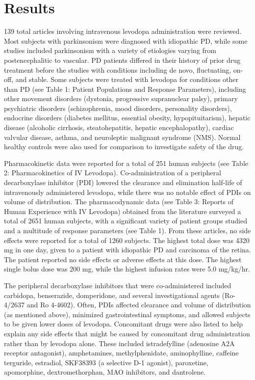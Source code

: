 \section{Results}
139 total articles involving intravenous levodopa administration were reviewed.  Most subjects with parkinsonism were diagnosed with idiopathic PD, while some studies included parkinsonism with a variety of etiologies varying from postencephalitic to vascular.  PD patients differed in their history of prior drug treatment before the studies with conditions including de novo, fluctuating, on-off, and stable.  Some subjects were treated with levodopa for conditions other than PD (see Table 1: Patient Populations and Response Parameters), including other movement disorders (dystonia, progressive supranuclear palsy), primary psychiatric disorders (schizophrenia, mood disorders, personality disorders),  endocrine disorders (diabetes mellitus, essential obesity, hypopituitarism), hepatic disease (alcoholic cirrhosis, steatohepatitis, hepatic encephalopathy), cardiac valvular disease, asthma, and neuroleptic malignant syndrome (NMS).  Normal healthy controls were also used for comparison to investigate safety of the drug.

Pharmacokinetic data were reported for a total of 251 human subjects (see Table 2: Pharmacokinetics of IV Levodopa).  Co-administration of a peripheral decarboxylase inhibitor (PDI) lowered the clearance and elimination half-life of intravenously administered levodopa, while there was no notable effect of PDIs on volume of distribution.
The pharmacodynamic data (see Table 3: Reports of Human Experience with IV Levodopa) obtained from the literature  surveyed a total of 2651 human subjects, with a significant variety of patient groups studied and a multitude of response parameters (see Table 1).  From these articles, no side effects were reported for a total of 1260 subjects.  The highest total dose was 4320 mg in one day, given to a patient with idiopathic PD and carcinoma of the retina.  The patient reported no side effects or adverse effects at this dose.  The highest single bolus dose was 200 mg, while the highest infusion rates were 5.0 mg/kg/hr.

The peripheral decarboxylase inhibitors that were co-administered included carbidopa, benserazide, domperidone, and several investigational agents (Ro-4/2637 and Ro 4-4602).  Often, PDIs affected clearance and volume of distribution (as mentioned above), minimized gastrointestinal symptoms, and allowed subjects to be given lower doses of levodopa.    
Concomitant drugs were also listed to help explain any side effects that might be caused by concomitant drug administration rather than by levodopa alone.  These included istradefylline (adenosine A2A receptor antagonist), amphetamines, methylphenidate, aminophylline, caffeine terguride, estradiol, SKF38393 (a selective D-1 agonist), paroxetine, apomorphine, dextromethorphan, MAO inhibitors, and dantrolene.  

